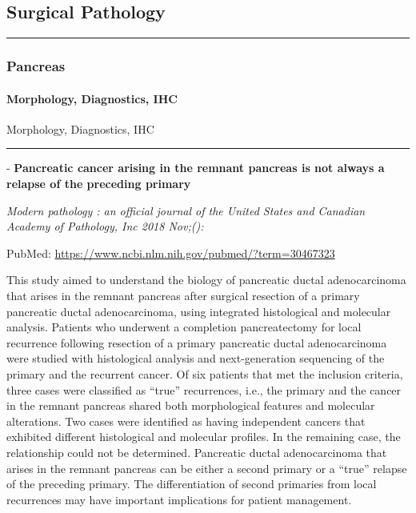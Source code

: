 \documentclass[]{article}
\let\oldparagraph\paragraph
\renewcommand{\paragraph}[1]{\oldparagraph{#1}\mbox{}}
\begin{document}
\hypertarget{surgical-pathology}{%
\subsection{Surgical Pathology}\label{surgical-pathology}}

\begin{center}\rule{0.5\linewidth}{\linethickness}\end{center}

\hypertarget{pancreas}{%
\subsubsection{Pancreas}\label{pancreas}}

\hypertarget{morphology-diagnostics-ihc}{%
\paragraph{Morphology, Diagnostics,
IHC}\label{morphology-diagnostics-ihc}}

Morphology, Diagnostics, IHC

\begin{center}\rule{0.5\linewidth}{\linethickness}\end{center}

 - \textbf{Pancreatic cancer arising in the remnant pancreas is not
always a relapse of the preceding primary}

\emph{Modern pathology : an official journal of the United States and
Canadian Academy of Pathology, Inc 2018 Nov;():}

PubMed: \url{https://www.ncbi.nlm.nih.gov/pubmed/?term=30467323}

This study aimed to understand the biology of pancreatic ductal
adenocarcinoma that arises in the remnant pancreas after surgical
resection of a primary pancreatic ductal adenocarcinoma, using
integrated histological and molecular analysis. Patients who underwent a
completion pancreatectomy for local recurrence following resection of a
primary pancreatic ductal adenocarcinoma were studied with histological
analysis and next-generation sequencing of the primary and the recurrent
cancer. Of six patients that met the inclusion criteria, three cases
were classified as ``true'' recurrences, i.e., the primary and the
cancer in the remnant pancreas shared both morphological features and
molecular alterations. Two cases were identified as having independent
cancers that exhibited different histological and molecular profiles. In
the remaining case, the relationship could not be determined. Pancreatic
ductal adenocarcinoma that arises in the remnant pancreas can be either
a second primary or a ``true'' relapse of the preceding primary. The
differentiation of second primaries from local recurrences may have
important implications for patient management.
\end{document}
